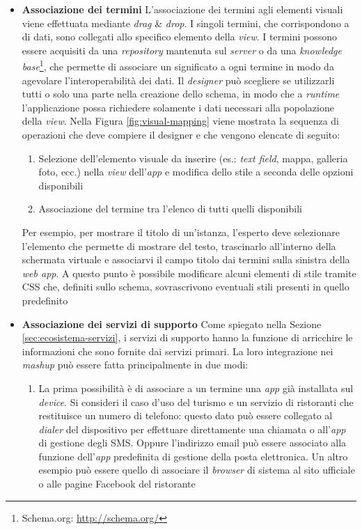 \begin{itemize}
	\item \textbf{Associazione dei termini} 
	L'associazione dei termini agli elementi visuali viene effettuata mediante \emph{drag} \& \emph{drop}. I singoli termini, che corrispondono a  di dati, sono collegati allo specifico elemento della \emph{view}. 
	I termini possono essere acquisiti da una \emph{repository} mantenuta sul \emph{server} o da una \emph{knowledge base}\footnote{Schema.org: \url{http://schema.org/}}, che permette di associare un significato a ogni termine in modo da agevolare l'interoperabilità dei dati. Il \emph{designer} può scegliere se utilizzarli tutti o solo una parte nella creazione dello schema, in modo che a \emph{runtime} l'applicazione possa richiedere solamente i dati necessari alla popolazione della \emph{view}.
	Nella Figura \ref{fig:visual-mapping} viene mostrata la sequenza di operazioni che deve compiere il designer e che vengono elencate di seguito:
	\begin{enumerate}
		\item
		Selezione dell'elemento visuale da inserire (es.: \emph{text field}, mappa, galleria foto, ecc.) nella \emph{view} dell'\emph{app} e modifica dello stile a seconda delle opzioni disponibili
		\item
		Associazione del termine tra l'elenco di tutti quelli disponibili
	\end{enumerate}
	Per esempio, per mostrare il titolo di un'istanza, l'esperto deve selezionare l'elemento che permette di mostrare del testo, trascinarlo all'interno della schermata virtuale e associarvi il campo titolo dai termini sulla sinistra della \emph{web app}. A questo punto è possibile modificare alcuni elementi di stile tramite CSS che, definiti sullo schema, sovrascrivono eventuali stili presenti in quello predefinito
	\item \textbf{Associazione dei servizi di supporto}
	Come spiegato nella Sezione \ref{sec:ecosistema-servizi}, i servizi di supporto hanno la funzione di arricchire le informazioni che sono fornite dai servizi primari. La loro integrazione nei \emph{mashup} può essere fatta principalmente in due modi:
	\begin{enumerate}
		\item
		La prima possibilità è di associare a un termine una \emph{app} già installata sul \emph{device}. Si consideri il caso d'uso del turismo e un servizio di ristoranti che restituisce un numero di telefono: questo dato può essere collegato al \emph{dialer} del dispositivo per effettuare direttamente una chiamata o all'\emph{app} di gestione degli SMS. Oppure l'indirizzo email può essere associato alla funzione  dell'\emph{app} predefinita di gestione della posta elettronica. Un altro esempio può essere quello di associare il \emph{browser} di sistema al sito ufficiale o alle pagine Facebook del ristorante

\end{enumerate}
\end{itemize}
